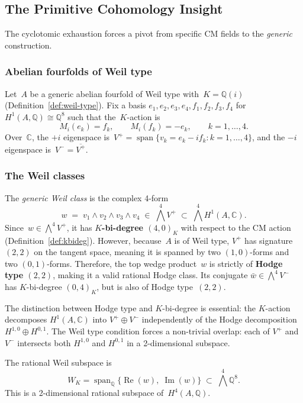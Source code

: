 \documentclass[11pt]{article}
\theoremstyle{plain}
\theoremstyle{definition}
\theoremstyle{remark}
\newcommand{\Q}{\mathbb{Q}}
\newcommand{\C}{\mathbb{C}}
\begin{document}
\subsection{The Primitive Cohomology Insight}
\label{sec:primitive}

The cyclotomic exhaustion forces a pivot from specific CM fields to the
\emph{generic} construction.

\subsubsection{Abelian fourfolds of Weil type}

Let~$A$ be a generic abelian fourfold of Weil type with~$K = \Q(i)$
(Definition~\ref{def:weil-type}).  Fix a basis $e_1, e_2, e_3, e_4, f_1,
f_2, f_3, f_4$ for~$H^1(A,\Q) \cong \Q^8$ such that the~$K$-action is
\[
  M_i(e_k) = f_k, \qquad M_i(f_k) = -e_k, \qquad k = 1,\ldots,4.
\]
Over~$\C$, the $+i$ eigenspace is~$V^+ = \operatorname{span}\{v_k =
e_k - if_k : k = 1,\ldots,4\}$, and the $-i$ eigenspace
is~$V^- = \overline{V^+}$.

\subsubsection{The Weil classes}

The \emph{generic Weil class} is the complex 4-form
\[
  w \;=\; v_1 \wedge v_2 \wedge v_3 \wedge v_4
  \;\in\; \textstyle\bigwedge^4 V^+
  \;\subset\; \textstyle\bigwedge^4 H^1(A,\C).
\]
Since~$w \in \bigwedge^4 V^+$, it has \textbf{$K$-bi-degree $(4,0)_K$} with
respect to the CM action (Definition~\ref{def:kbideg}).  However, because~$A$
is of Weil type, $V^+$ has signature $(2,2)$ on the tangent space, meaning it
is spanned by two $(1,0)$-forms and two $(0,1)$-forms.  Therefore, the top
wedge product~$w$ is strictly of \textbf{Hodge type $(2,2)$}, making it a
valid rational Hodge class.  Its conjugate $\bar{w} \in \bigwedge^4 V^-$ has
$K$-bi-degree $(0,4)_K$, but is also of Hodge type~$(2,2)$.

The distinction between Hodge type and $K$-bi-degree is essential: the
$K$-action decomposes $H^1(A,\C)$ into $V^+ \oplus V^-$ independently of
the Hodge decomposition $H^{1,0} \oplus H^{0,1}$.  The Weil type condition
forces a non-trivial overlap: each of $V^+$ and $V^-$ intersects both
$H^{1,0}$ and $H^{0,1}$ in a 2-dimensional subspace.

The rational Weil subspace is
\[
  W_K = \operatorname{span}_\Q\{\operatorname{Re}(w),\;
  \operatorname{Im}(w)\}
  \;\subset\; \textstyle\bigwedge^4 \Q^8.
\]
This is a 2-dimensional rational subspace of~$H^4(A,\Q)$.
\end{document}
